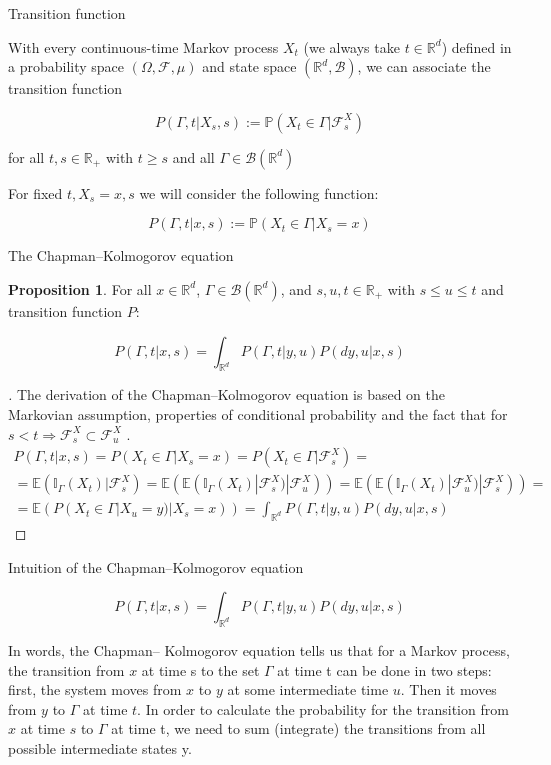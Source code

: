 \documentclass{beamer}%
\theoremstyle{definition}
\newtheorem{proposition}[theorem]{Proposition}
\newcommand{\R}{\mathbb{R}}
\newcommand{\E}{\mathbb{E}}
\renewcommand{\P}{\mathbb{P}}
\begin{document}
\begin{frame}{Transition function}

With every continuous-time Markov process $X_t$ (we always take $t \in \R^d$) defined in a
probability space $(\Omega, \mathcal{F}, \mu)$ and state space $(\R^d, \mathcal{B})$, we can associate the transition
function

\[P(\Gamma, t| X_s, s) := \P(X_t \in \Gamma | \mathcal{F}^X_s)\]

for all $t,s \in \R_+$ with $t \geq s$ and all $\Gamma \in \mathcal{B}(\R^d )$

For fixed $t, X_s = x, s$ we will consider the following function:

\[P(\Gamma, t| x, s) := \P(X_t \in \Gamma | X_s = x)\]
    
\end{frame}

\begin{frame}{The Chapman–Kolmogorov equation}

\begin{proposition}
For all $x \in \R^d$, $\Gamma \in \mathcal{B}(\R^d)$, and $s,u,t \in \R_+$ with $ s \leq u \leq  t$ and transition function $P$:

\[P(\Gamma ,t|x,s) = \int_{\R^d} P(\Gamma ,t|y,u)P(dy,u|x,s)\]
\end{proposition}

\begin{proof}[]
The derivation of the Chapman–Kolmogorov equation is based on the Markovian
assumption, properties of conditional probability and the fact that for $s < t \Rightarrow \mathcal{F}_s^X \subset \mathcal{F}_u^X$ .
\begin{gather*}
    P(\Gamma, t| x, s) = P(X_t \in \Gamma| X_s = x) =  P(X_t \in \Gamma| \mathcal{F}_s^X) = \\ =
    \E(\mathbb{I}_\Gamma(X_t) | \mathcal{F}_s^X) = \E(\E(\mathbb{I}_\Gamma(X_t) | \mathcal{F}_s^X)| \mathcal{F}_u^X)) = \E(\E(\mathbb{I}_\Gamma(X_t) | \mathcal{F}_u^X)| \mathcal{F}_s^X)) = \\ = \E( P(X_t \in \Gamma |X_u = y)| X_s = x)) = \int_{\R^d} P(\Gamma, t| y, u) P(dy, u|x, s)
\end{gather*}
\end{proof}
    
\end{frame}

\begin{frame}{Intuition of the Chapman–Kolmogorov equation}

\[P(\Gamma, t| x, s) =  \int_{\R^d} P(\Gamma, t| y, u) P(dy, u|x, s)\]

In words, the Chapman–
Kolmogorov equation tells us that for a Markov process, the transition from $x$ at
time s to the set $\Gamma$ at time t can be done in two steps: first, the system moves from
$x$ to $y$ at some intermediate time $u$. Then it moves from $y$ to $\Gamma$ at time $t$. In order to
calculate the probability for the transition from $x$ at time $s$ to $\Gamma$ at time t, we need to
sum (integrate) the transitions from all possible intermediate states y.
\end{frame}
\end{document}
